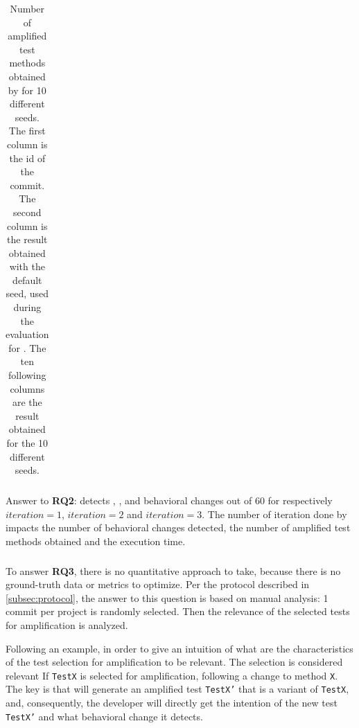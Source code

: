 \begin{table}
\small
\def\arraystretch{.5}%
\setlength\tabcolsep{3pt} %
\caption{Number of amplified test methods obtained by \DCI for 10 different seeds. The first column is the id of the commit. The second column is the result obtained with the default seed, used during the evaluation for \rqdetection. The ten following columns are the result obtained for the 10 different seeds.}
\label{tab:overall_result_seeds}
\begin{tabular}{l|c|llllllllll}

\end{tabular}
\end{table}

\begin{mdframed}
Answer to \textbf{RQ2}: \DCII detects  , , and  behavioral changes out of 60 for respectively $iteration=1$, $iteration=2$ and $iteration=3$.
The number of iteration done by \DCII impacts the number of behavioral changes detected, the number of amplified test methods obtained and the execution time.
\end{mdframed}


\subsubsection{\rqselection}
\label{subsubsec:dci:evaluation:rq3}

To answer \textbf{RQ3}, there is no quantitative approach to take, because there is no ground-truth data or metrics to optimize. 
Per the protocol described in \autoref{subsec:protocol}, the answer to this question is based on manual analysis:
1 commit per project is randomly selected.
Then the relevance of the selected tests for amplification is analyzed.

Following an example, in order to give an intuition of what are the characteristics of the test selection for amplification to be relevant.
The selection is considered relevant If \texttt{TestX} is selected for amplification, following a change to method \texttt{X}.
The key is that \DCI will generate an amplified test \texttt{TestX'} that is a variant of \texttt{TestX}, and, consequently, the developer will directly get the intention of the new test \texttt{TestX'} and what behavioral change it detects.

